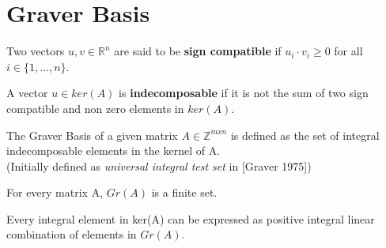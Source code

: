 \chapter{Graver Basis} \label{literature}

\begin{definition}
Two vectors $u,v \in \mathbb{R}^n$ are said to be \textbf{sign compatible} if $u_i \cdot v_i \geq 0$ for all $i \in \{1,...,n\}$.
\end{definition}

\begin{definition}
A vector $u \in ker(A)$ is \textbf{indecomposable} if it is not the sum of two sign compatible and non zero elements in $ker(A)$.
\end{definition}

\begin{definition}
The Graver Basis of a given matrix $A \in \mathbb{Z}^{mxn}$ is defined as the set of integral indecomposable elements in the kernel of A.\\
(Initially defined as \textit{universal integral test set} in [Graver 1975])
\end{definition}



\begin{proposition}
For every matrix A, $Gr(A)$ is a finite set.
\end{proposition}

\begin{proposition}
Every integral element in ker(A) can be expressed as positive integral linear combination of elements in $Gr(A)$.
\end{proposition}

